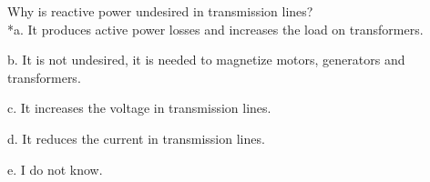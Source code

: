 
Why is reactive power undesired in transmission lines?\\

*a. It produces active power losses and increases the load on transformers.

b. It is not undesired, it is needed to magnetize motors, generators and transformers.

c. It increases the voltage in transmission lines.

d. It reduces the current in transmission lines.

e. I do not know.
 \newline
